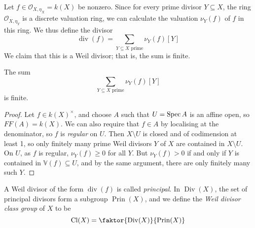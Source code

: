 Let \( f \in \mathcal O_{X, \eta_X} = k(X) \) be nonzero.
Since for every prime divisor \( Y \subseteq X \), the ring \( \mathcal O_{X, \eta_Y} \) is a discrete valuation ring, we can calculate the valuation \( \nu_Y(f) \) of \( f \) in this ring.
We thus define the divisor
\[ \operatorname{div}(f) = \sum_{Y \subseteq X \text{ prime}} \nu_Y(f) [Y] \]
We claim that this is a Weil divisor; that is, the sum is finite.
\begin{proposition}
    The sum
    \[ \sum_{Y \subseteq X \text{ prime}} \nu_Y(f) [Y] \]
    is finite.
\end{proposition}
\begin{proof}
    Let \( f \in k(X)^\times \), and choose \( A \) such that \( U = \operatorname{Spec} A \) is an affine open, so \( FF(A) = k(X) \).
    We can also require that \( f \in A \) by localising at the denominator, so \( f \) is \emph{regular} on \( U \).
    Then \( X \setminus U \) is closed and of codimension at least 1, so only finitely many prime Weil divisors \( Y \) of \( X \) are contained in \( X \setminus U \).
    On \( U \), as \( f \) is regular, \( \nu_Y(f) \geq 0 \) for all \( Y \).
    But \( \nu_Y(f) > 0 \) if and only if \( Y \) is contained in \( \mathbb V(f) \subseteq U \), and by the same argument, there are only finitely many such \( Y \).
\end{proof}
\begin{definition}
    A Weil divisor of the form \( \operatorname{div}(f) \) is called \emph{principal}.
    In \( \operatorname{Div}(X) \), the set of principal divisors form a subgroup \( \operatorname{Prin}(X) \), and we define the \emph{Weil divisor class group} of \( X \) to be
    \[ \operatorname{Cl}(X) = \faktor{\operatorname{Div}(X)}{\operatorname{Prin}(X)} \]
\end{definition}
